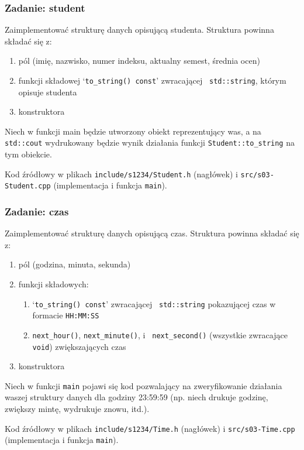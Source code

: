 \documentclass[aspectratio=169,10pt]{beamer}
\begin{document}
\begin{frame}
    \frametitle{Zadanie: student}
    \label{lecture_exercise_0}

    Zaimplementować strukturę danych opisującą studenta. Struktura powinna
    składać się z:
    \begin{enumerate}
        \item pól (imię, nazwisko, numer indeksu, aktualny semest,
            średnia ocen)
        \item funkcji składowej `{\tt to\_string() const}' zwracającej {\tt
            std::string}, którym opisuje studenta
        \item konstruktora
    \end{enumerate}

    Niech w funkcji main będzie utworzony obiekt reprezentujący was, a na
    \texttt{std::cout} wydrukowany będzie wynik działania funkcji
    \texttt{Student::to\_string} na tym obiekcie.

    \vspace{1em}

    {\footnotesize
    Kod źródłowy w plikach {\tt include/s1234/Student.h} (nagłówek) i
    {\tt src/s03-Student.cpp} (implementacja i funkcja {\tt main}).}
\end{frame}

\begin{frame}
    \frametitle{Zadanie: czas}
    \label{lecture_exercise_1}

    Zaimplementować strukturę danych opisującą czas. Struktura powinna składać
    się z:
    \begin{enumerate}
        \item pól (godzina, minuta, sekunda)
        \item funkcji składowych:
            \begin{enumerate}
                \item `{\tt to\_string() const}' zwracającej {\tt
                    std::string} pokazującej czas w formacie {\tt HH:MM:SS}
                \item {\tt next\_hour()}, {\tt next\_minute()}, i {\tt
                    next\_second()} (wszystkie zwracające {\tt void})
                    zwiększających czas
            \end{enumerate}
        \item konstruktora
    \end{enumerate}

    Niech w funkcji \texttt{main} pojawi się kod pozwalający na zweryfikowanie
    działania waszej struktury danych dla godziny 23:59:59 (np. niech drukuje
    godzinę, zwiększy mintę, wydrukuje znowu, itd.).

    \vspace{1em}

    {\footnotesize
    Kod źródłowy w plikach {\tt include/s1234/Time.h} (nagłówek) i
    {\tt src/s03-Time.cpp} (implementacja i funkcja {\tt main}).}
\end{frame}
\end{document}
